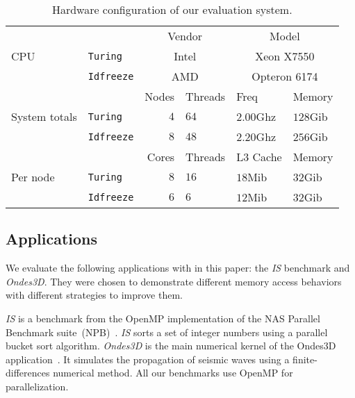 \begin{table}
    \centering
    \begin{tabular}{lp{1.1cm}rp{1cm}p{1.35cm}p{1cm}}
        \toprule
        \multirow{3}{.8cm}{CPU}
        &  & \multicolumn{2}{c}{Vendor} & \multicolumn{2}{c}{Model} \\
        \cmidrule(lr){3-6}
        & \texttt{Turing}  & \multicolumn{2}{c}{Intel} & \multicolumn{2}{c}{Xeon X7550} \\
        & \texttt{Idfreeze} & \multicolumn{2}{c}{AMD} & \multicolumn{2}{c}{Opteron 6174} \\
        \midrule
        \multirow{3}{.8cm}{System totals}
        & & Nodes & Threads & Freq & Memory \\
        \cmidrule(lr){3-6}
        & \texttt{Turing}     & $4$ & $64$ & $2.00$Ghz & $128$Gib \\
        & \texttt{Idfreeze} & $8$ & $48$   & $2.20$Ghz        &  $256$Gib\\
        \midrule
        \multirow{3}{.8cm}{Per node}
        & & Cores & Threads & L3 Cache & Memory \\
        \cmidrule(lr){3-6}
        & \texttt{Turing}     & $8$ & $16$ & $18$Mib & $32$Gib \\
        & \texttt{Idfreeze}   & $6$  & $6$   & $12$Mib  &  $32$Gib \\
        \bottomrule
    \end{tabular}
    \caption{Hardware configuration of our evaluation system.}
    \label{tab:hw}
\end{table}

\subsection{Applications}

We evaluate the following applications with \TABARNAC in this paper: %
the \emph{IS} benchmark and \emph{Ondes3D}.
They were chosen to demonstrate different memory access behaviors with different strategies to improve them.

\emph{IS} is a benchmark from the OpenMP implementation of the NAS Parallel Benchmark suite~(NPB)~\cite{Jin1999}. \emph{IS} sorts a set of integer numbers using a parallel bucket sort algorithm.
\emph{Ondes3D} is the main numerical kernel of the Ondes3D
application~\cite{Dupros2008}. It simulates the propagation of seismic waves
using a finite-differences numerical method. All our benchmarks use OpenMP for
parallelization.

